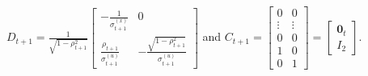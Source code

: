 $D_{t+1} =  \frac{1}{\sqrt{ 1-\rho_{t+1}^2} }\begin{bmatrix}
-\frac{1}{\sigma_{t+1}^{\left(x\right)}} & 0 \\
\frac{\rho_{t+1}}{\sigma_{t+1}^{\left(u\right)}} & -\frac{\sqrt{1-\rho_{t+1}^2}}{\sigma_{t+1}^{\left(u\right)}}
\end{bmatrix}$ and $C_{t+1} = \begin{bmatrix} 0 & 0 \\ \vdots & \vdots \\ 0 & 0 \\ 1 & 0 \\ 0 & 1 \end{bmatrix} = \begin{bmatrix}
\mathbf{0}_t \\ I_{2} \end{bmatrix}$. 


